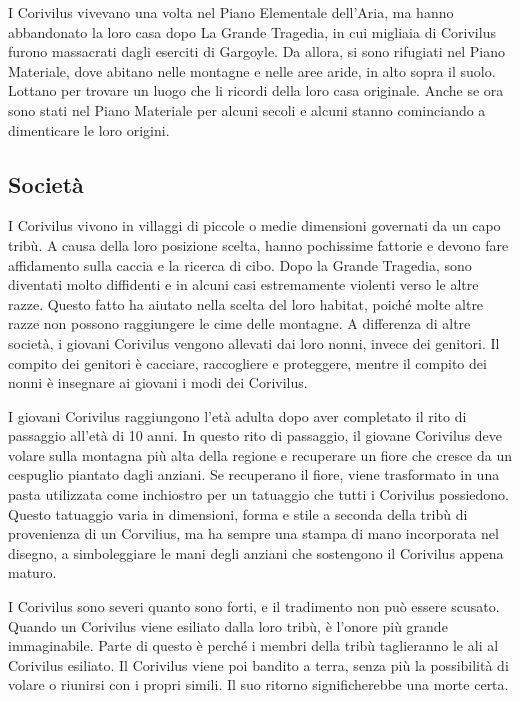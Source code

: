 I Corivilus vivevano una volta nel Piano Elementale dell'Aria, ma hanno
abbandonato la loro casa dopo La Grande Tragedia, in cui migliaia di
Corivilus furono massacrati dagli eserciti di Gargoyle. Da allora, si
sono rifugiati nel Piano Materiale, dove abitano nelle montagne e nelle
aree aride, in alto sopra il suolo. Lottano per trovare un luogo che li
ricordi della loro casa originale. Anche se ora sono stati nel Piano
Materiale per alcuni secoli e alcuni stanno cominciando a dimenticare le
loro origini.

\subsection{Società}\label{societuxe0}

I Corivilus vivono in villaggi di piccole o medie dimensioni governati
da un capo tribù. A causa della loro posizione scelta, hanno pochissime
fattorie e devono fare affidamento sulla caccia e la ricerca di cibo.
Dopo la Grande Tragedia, sono diventati molto diffidenti e in alcuni
casi estremamente violenti verso le altre razze. Questo fatto ha aiutato
nella scelta del loro habitat, poiché molte altre razze non possono
raggiungere le cime delle montagne. A differenza di altre società, i
giovani Corivilus vengono allevati dai loro nonni, invece dei genitori.
Il compito dei genitori è cacciare, raccogliere e proteggere, mentre il
compito dei nonni è insegnare ai giovani i modi dei Corivilus.

I giovani Corivilus raggiungono l'età adulta dopo aver completato il
rito di passaggio all'età di 10 anni. In questo rito di passaggio, il
giovane Corivilus deve volare sulla montagna più alta della regione e
recuperare un fiore che cresce da un cespuglio piantato dagli anziani.
Se recuperano il fiore, viene trasformato in una pasta utilizzata come
inchiostro per un tatuaggio che tutti i Corivilus possiedono. Questo
tatuaggio varia in dimensioni, forma e stile a seconda della tribù di
provenienza di un Corvilius, ma ha sempre una stampa di mano incorporata
nel disegno, a simboleggiare le mani degli anziani che sostengono il
Corivilus appena maturo.

I Corivilus sono severi quanto sono forti, e il tradimento non può
essere scusato. Quando un Corivilus viene esiliato dalla loro tribù, è
l'onore più grande immaginabile. Parte di questo è perché i membri della
tribù taglieranno le ali al Corivilus esiliato. Il Corivilus viene poi
bandito a terra, senza più la possibilità di volare o riunirsi con i
propri simili. Il suo ritorno significherebbe una morte certa.


